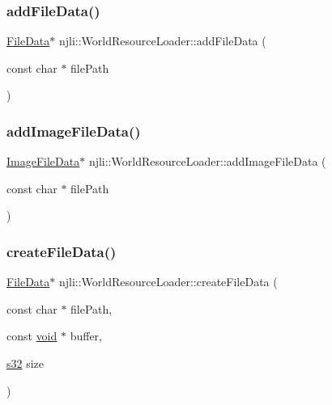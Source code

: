 \subsubsection{\texorpdfstring{add\+File\+Data()}{addFileData()}}
{\footnotesize\ttfamily \mbox{\hyperlink{structnjli_1_1_world_resource_loader_1_1_file_data}{File\+Data}}$\ast$ njli\+::\+World\+Resource\+Loader\+::add\+File\+Data (\begin{DoxyParamCaption}\item[{const char $\ast$}]{file\+Path }\end{DoxyParamCaption})\hspace{0.3cm}{\ttfamily [protected]}}

\mbox{\label{classnjli_1_1_world_resource_loader_a7b630b94f3d5b5ee3b599e1585e51dea}} 
\subsubsection{\texorpdfstring{add\+Image\+File\+Data()}{addImageFileData()}}
{\footnotesize\ttfamily \mbox{\hyperlink{structnjli_1_1_world_resource_loader_1_1_image_file_data}{Image\+File\+Data}}$\ast$ njli\+::\+World\+Resource\+Loader\+::add\+Image\+File\+Data (\begin{DoxyParamCaption}\item[{const char $\ast$}]{file\+Path }\end{DoxyParamCaption})\hspace{0.3cm}{\ttfamily [protected]}}

\mbox{\label{classnjli_1_1_world_resource_loader_a0563ad167a4c6552f0535ae191e6e2a0}} 
\subsubsection{\texorpdfstring{create\+File\+Data()}{createFileData()}}
{\footnotesize\ttfamily \mbox{\hyperlink{structnjli_1_1_world_resource_loader_1_1_file_data}{File\+Data}}$\ast$ njli\+::\+World\+Resource\+Loader\+::create\+File\+Data (\begin{DoxyParamCaption}\item[{const char $\ast$}]{file\+Path,  }\item[{const \mbox{\hyperlink{_thread_8h_af1e856da2e658414cb2456cb6f7ebc66}{void}} $\ast$}]{buffer,  }\item[{\mbox{\hyperlink{_util_8h_aa62c75d314a0d1f37f79c4b73b2292e2}{s32}}}]{size }\end{DoxyParamCaption})\hspace{0.3cm}{\ttfamily [protected]}}

